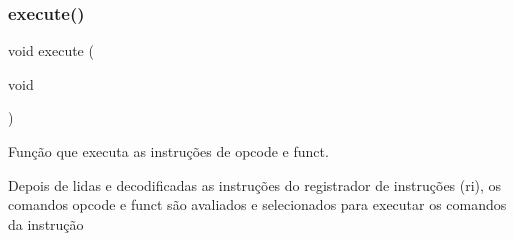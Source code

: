 \mbox{\label{recorder_8c_a4fbe3f6f1beeb9904f150f3d65943a1c}} 
\subsubsection{execute()}
{\footnotesize\ttfamily void execute (\begin{DoxyParamCaption}\item[{void}]{ }\end{DoxyParamCaption})}



Função que executa as instruções de opcode e funct. 

Depois de lidas e decodificadas as instruções do registrador de instruções (ri), os comandos opcode e funct são avaliados e selecionados para executar os comandos da instrução 
